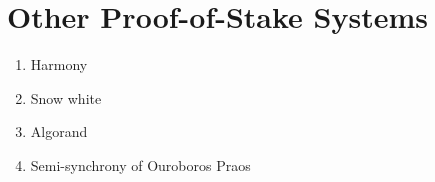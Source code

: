 \section{Other Proof-of-Stake Systems}\label{sec.other}

\begin{enumerate}
\item Harmony
\item Snow white
\item Algorand
\item Semi-synchrony of Ouroboros Praos
\end{enumerate}
